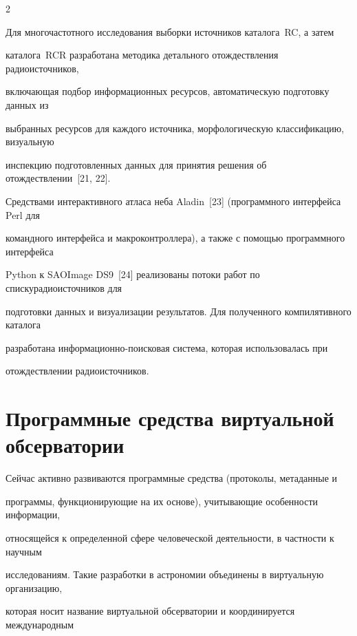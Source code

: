 \begin{multicols}{2}
      

      Для многочастотного исследования выборки источни\-ков каталога~RC, а затем 

каталога~RCR разработана методика детального отождествления радиоис\-точников, 

включающая подбор информационных ресурсов, автоматическую подготовку данных из 

выбранных ресурсов для каждого источника, морфологическую классификацию, визуальную 

инспекцию подготовленных данных для принятия решения об отождествлении~[21, 22]. 

Средствами интерактивного атласа неба Aladin~[23] (программного интерфейса Perl для 

командного интерфейса и макроконтроллера), а также с по\-мощью программного интерфейса 

Python к SAOImage DS9~[24] реализованы потоки работ по списку\linebreak радиоисточников для 

подготовки данных и визуализации результатов. Для полученного компилятивного каталога 

разработана ин\-фор\-ма\-ци\-он\-но-по\-иско\-вая сис\-те\-ма, которая использовалась при\linebreak 

отождествлении радиоисточников. 



\vspace*{-9pt}



\section{Программные средства виртуальной обсерватории}



\vspace*{-2pt}



      Сейчас активно развиваются программные средства (протоколы, метаданные и 

программы, функционирующие на их основе), учитывающие особенности информации, 

относящейся к определенной сфере человеческой деятельности, в частности к научным 

исследованиям. Такие разработки в астрономии объединены в виртуальную организацию, 

которая носит название виртуальной обсерватории и координируется международным 


\end{multicols}
